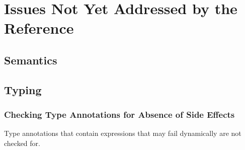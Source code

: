  

\chapter{Issues Not Yet Addressed by the Reference\label{appendix:MissingTransliteration}}
\section{Semantics}

\section{Typing}

\subsection{Checking Type Annotations for Absence of Side Effects}
Type annotations that contain expressions that may fail dynamically are not checked for.


